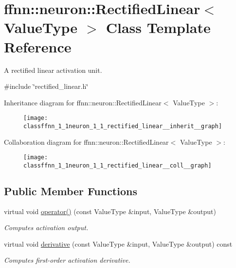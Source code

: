 \hypertarget{classffnn_1_1neuron_1_1_rectified_linear}{\section{ffnn\-:\-:neuron\-:\-:Rectified\-Linear$<$ Value\-Type $>$ Class Template Reference}
\label{classffnn_1_1neuron_1_1_rectified_linear}
}


A rectified linear activation unit.  




{\ttfamily \#include \char`\"{}rectified\-\_\-linear.\-h\char`\"{}}



Inheritance diagram for ffnn\-:\-:neuron\-:\-:Rectified\-Linear$<$ Value\-Type $>$\-:\nopagebreak
\begin{figure}[H]
\begin{center}
\leavevmode
\texttt{[image: classffnn\_1\_1neuron\_1\_1\_rectified\_linear\_\_inherit\_\_graph]}
\end{center}
\end{figure}


Collaboration diagram for ffnn\-:\-:neuron\-:\-:Rectified\-Linear$<$ Value\-Type $>$\-:\nopagebreak
\begin{figure}[H]
\begin{center}
\leavevmode
\texttt{[image: classffnn\_1\_1neuron\_1\_1\_rectified\_linear\_\_coll\_\_graph]}
\end{center}
\end{figure}
\subsection*{Public Member Functions}
\begin{DoxyCompactItemize}
\item 
virtual void \hyperlink{classffnn_1_1neuron_1_1_rectified_linear_a11584934d68646ccced2c0c1c382960d}{operator()} (const Value\-Type \&input, Value\-Type \&output)
\begin{DoxyCompactList}\small\item\em Computes activation output. \end{DoxyCompactList}\item 
virtual void \hyperlink{classffnn_1_1neuron_1_1_rectified_linear_a8c45f64142bf994a96f4987cdd81e32f}{derivative} (const Value\-Type \&input, Value\-Type \&output) const 
\begin{DoxyCompactList}\small\item\em Computes first-\/order activation derivative. \end{DoxyCompactList}\end{DoxyCompactItemize}


